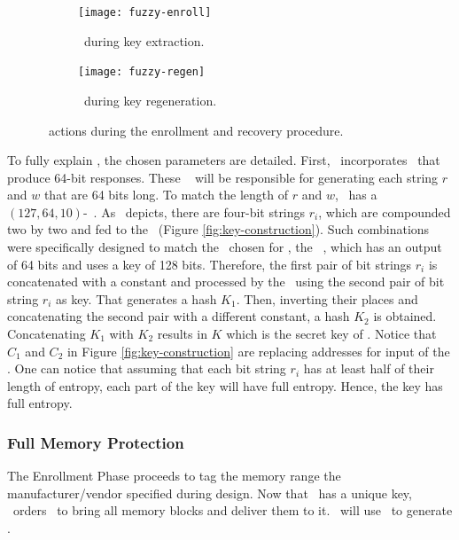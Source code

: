 \begin{figure}
     \centering
     \begin{subfigure}[b]{0.5\textwidth}
         \centering
         \texttt{[image: fuzzy-enroll]}
         \caption{\fuzzy~during key extraction.}
         \label{fig:fuzzy-enroll}
     \end{subfigure}
     \hfill
     \begin{subfigure}[b]{0.5\textwidth}
         \centering
         \texttt{[image: fuzzy-regen]}
         \caption{\fuzzy~during key regeneration.}
         \label{fig:fuzzy-regen}
     \end{subfigure}

        \caption{\fuzzy~actions during the enrollment and recovery procedure.}
        \label{fig:fuzzy-extractor}
\end{figure}

To fully explain \fenroll, the chosen parameters are detailed. First, \cshia~incorporates \pufs~that produce 64-bit responses. These \pufs~ will be responsible for generating each string $r$ and $w$ that are 64 bits long. To match the length of $r$ and $w$, \cshia~has a $(127, 64, 10)$-\bch~\ecc. As \fenroll~depicts, there are four-bit strings $r_i$, which are compounded two by two and fed to the \prf~(Figure \ref{fig:key-construction}). Such combinations were specifically designed to match the \prf~chosen for \cshia, the \siphash~\cite{Aumasson2012:SipHash}, which has an output of 64 bits and uses a key of 128 bits. Therefore, the first pair of bit strings $r_i$ is concatenated with a constant and processed by the \prf~using the second pair of bit string $r_i$ as key. That generates a hash $K_1$. Then, inverting their places and concatenating the second pair with a different constant, a hash $K_2$ is obtained. Concatenating $K_1$ with $K_2$ results in $K$ which is the secret key of \cshia. Notice that $C_1$ and $C_2$ in Figure \ref{fig:key-construction} are replacing addresses for input of the \ptaggen. One can notice that assuming that each bit string $r_i$ has at least half of their length of entropy, each part of the key will have full entropy. Hence, the key has full entropy. 

\subsubsection{Full Memory Protection}
\label{subsubsec:Full-Memory-Protection}

The Enrollment Phase proceeds to tag the memory range the manufacturer\slash{}vendor specified during design. Now that \ptaggen~has a unique key, \seceng~orders \handler~to bring all memory blocks and deliver them to it. \seceng~will use \ptaggen~to generate \ptags.%

